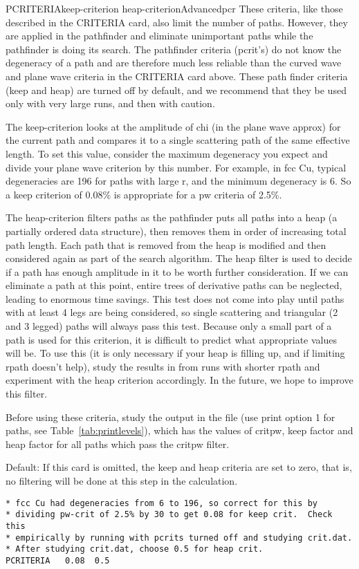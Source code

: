 \documentclass[11pt,oneside]{report} %
\begin{document}
\begin{Card}{PCRITERIA}{keep-criterion heap-criterion}{Advanced}{pcr}
  These criteria, like those described in the CRITERIA card, also
  limit the number of paths. However, they are applied in the
  pathfinder and eliminate unimportant paths while the pathfinder is
  doing its search.  The pathfinder criteria (pcrit's) do not know the
  degeneracy of a path and are therefore much less reliable than the
  curved wave and plane wave criteria in the CRITERIA card above.
  These path finder criteria (keep and heap) are turned off by
  default, and we recommend that they be used only with very large
  runs, and then with caution.

  The keep-criterion looks at the amplitude of chi (in the plane wave
  approx) for the current path and compares it to a single scattering
  path of the same effective length.  To set this value, consider the
  maximum degeneracy you expect and divide your plane wave criterion
  by this number.  For example, in fcc Cu, typical degeneracies are
  196 for paths with large r, and the minimum degeneracy is 6.  So a
  keep criterion of 0.08\% is appropriate for a pw criteria of 2.5\%.

  The heap-criterion filters paths as the pathfinder puts all paths
  into a heap (a partially ordered data structure), then removes them
  in order of increasing total path length.  Each path that is removed
  from the heap is modified and then considered again as part of the
  search algorithm. The heap filter is used to decide if a path has
  enough amplitude in it to be worth further consideration.  If we can
  eliminate a path at this point, entire trees of derivative paths can
  be neglected, leading to enormous time savings.  This test does not
  come into play until paths with at least 4 legs are being
  considered, so single scattering and triangular (2 and 3 legged)
  paths will always pass this test.  Because only a small part of a
  path is used for this criterion, it is difficult to predict what
  appropriate values will be.  To use this (it is only necessary if
  your heap is filling up, and if limiting rpath doesn't help), study
  the results in  from runs with shorter rpath and experiment
  with the heap criterion accordingly.  In the future, we hope to
  improve this filter.

  Before using these criteria, study the output in the file
   (use print option 1 for paths, see
  Table~\ref{tab:printlevels}), which has the values of critpw, keep
  factor and heap factor for all paths which pass the critpw filter.

  Default: If this card is omitted, the keep and heap criteria are set
  to zero, that is, no filtering will be done at this step in the
  calculation.

\begin{verbatim}
* fcc Cu had degeneracies from 6 to 196, so correct for this by
* dividing pw-crit of 2.5% by 30 to get 0.08 for keep crit.  Check this
* empirically by running with pcrits turned off and studying crit.dat.
* After studying crit.dat, choose 0.5 for heap crit.
PCRITERIA   0.08  0.5
\end{verbatim}
\end{Card}
\end{document}
